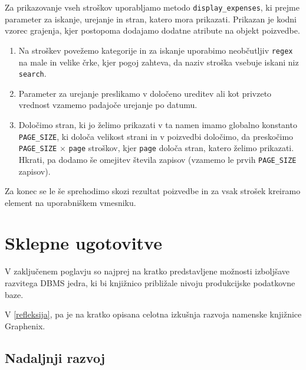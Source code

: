 \documentclass[a4paper,12pt,openright]{book}
\begin{document}
    \noindent
    Za prikazovanje vseh stroškov uporabljamo metodo {\tt display\_expenses}, ki prejme parameter za iskanje, urejanje in stran, katero mora prikazati. Prikazan je kodni vzorec grajenja, kjer postopoma dodajamo dodatne atribute na objekt poizvedbe. 
    \begin{enumerate}
        \item Na stroškev povežemo kategorije in za iskanje uporabimo neobčutljiv {\tt regex} na male in velike črke, kjer pogoj zahteva, da naziv stroška vsebuje iskani niz {\tt search}.
        \item Parameter za urejanje preslikamo v določeno ureditev ali kot privzeto vrednost vzamemo padajoče urejanje po datumu.
        \item Določimo stran, ki jo želimo prikazati v ta namen imamo globalno konstanto {\tt PAGE\_SIZE}, ki določa velikost strani in v poizvedbi določimo, da preskočimo {\tt PAGE\_SIZE} $\times$ {\tt page} stroškov, kjer {\tt page} določa stran, katero želimo prikazati. Hkrati, pa dodamo še omejitev števila zapisov (vzamemo le prvih {\tt PAGE\_SIZE} zapisov).
    \end{enumerate}

    \noindent
    Za konec se le še sprehodimo skozi rezultat poizvedbe in za vsak strošek kreiramo element na uporabniškem vmesniku.
    

\chapter{Sklepne ugotovitve}
    
    V zaključenem poglavju so najprej na kratko predstavljene možnosti izboljšave razvitega DBMS jedra, ki bi knjižnico približale nivoju produkcijske podatkovne baze.

    V \ref{refleksija}, pa je na kratko opisana celotna izkušnja razvoja namenske knjižnice Graphenix.
    
    \section{Nadaljnji razvoj}
\end{document}
